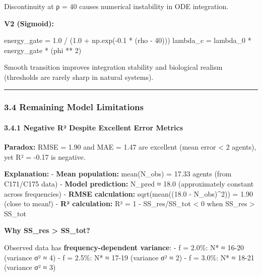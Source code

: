 \documentclass[
]{article}
\newenvironment{Shaded}{}{}
\newcommand{\DecValTok}[1]{\textcolor[rgb]{0.25,0.63,0.44}{#1}}
\newcommand{\FloatTok}[1]{\textcolor[rgb]{0.25,0.63,0.44}{#1}}
\newcommand{\NormalTok}[1]{#1}
\newcommand{\OperatorTok}[1]{\textcolor[rgb]{0.40,0.40,0.40}{#1}}
\begin{document}
Discontinuity at ρ = 40 causes numerical instability in ODE integration.

\textbf{V2 (Sigmoid):}

\begin{Shaded}
\begin{Highlighting}[]
\NormalTok{energy\_gate }\OperatorTok{=} \FloatTok{1.0} \OperatorTok{/}\NormalTok{ (}\FloatTok{1.0} \OperatorTok{+}\NormalTok{ np.exp(}\OperatorTok{{-}}\FloatTok{0.1} \OperatorTok{*}\NormalTok{ (rho }\OperatorTok{{-}} \DecValTok{40}\NormalTok{)))}
\NormalTok{lambda\_c }\OperatorTok{=}\NormalTok{ lambda\_0 }\OperatorTok{*}\NormalTok{ energy\_gate }\OperatorTok{*}\NormalTok{ (phi }\OperatorTok{**} \DecValTok{2}\NormalTok{)}
\end{Highlighting}
\end{Shaded}

Smooth transition improves integration stability and biological realism
(thresholds are rarely sharp in natural systems).

\begin{center}\rule{0.5\linewidth}{0.5pt}\end{center}

\subsubsection{3.4 Remaining Model
Limitations}\label{remaining-model-limitations}

\paragraph{3.4.1 Negative R² Despite Excellent Error
Metrics}\label{negative-ruxb2-despite-excellent-error-metrics}

\textbf{Paradox:} RMSE = 1.90 and MAE = 1.47 are excellent (mean error
\textless{} 2 agents), yet R² = -0.17 is negative.

\textbf{Explanation:} - \textbf{Mean population:} mean(N\_obs) = 17.33
agents (from C171/C175 data) - \textbf{Model prediction:} N\_pred ≈ 18.0
(approximately constant across frequencies) - \textbf{RMSE calculation:}
sqrt(mean((18.0 - N\_obs)\^{}2)) = 1.90 (close to mean!) - \textbf{R²
calculation:} R² = 1 - SS\_res/SS\_tot \textless{} 0 when SS\_res
\textgreater{} SS\_tot

\textbf{Why SS\_res \textgreater{} SS\_tot?}

Observed data has \textbf{frequency-dependent variance}: - f = 2.0\%: N*
≈ 16-20 (variance σ² ≈ 4) - f = 2.5\%: N* ≈ 17-19 (variance σ² ≈ 2) - f
= 3.0\%: N* ≈ 18-21 (variance σ² ≈ 3)
\end{document}
